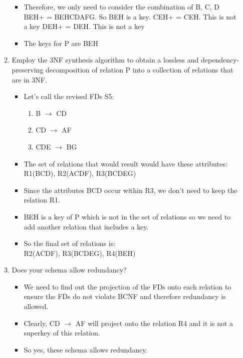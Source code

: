 \documentclass{article}
\begin{document}
\begin{enumerate}
\begin{enumerate}
\begin{itemize}
\item %
Therefore, we only need to consider the combination of B, C, D\\
BEH+ = BEHCDAFG. So BEH is a key.
CEH+ = CEH. This is not a key
DEH+ = DEH. This is not a key

\item %
The keys for P are BEH
\end{itemize}

\item %
Employ the 3NF synthesis algorithm to obtain a lossless and dependency-preserving decomposition of
relation P into a collection of relations that are in 3NF.

 \begin{itemize}
\item %
Let's call the revised FDs S5:
\begin{enumerate} 
\item B $\rightarrow$ CD
\item CD $\rightarrow$ AF
\item CDE $\rightarrow$ BG
\end{enumerate}

\item %
The set of relations that would result would have these attributes: \\
R1(BCD), R2(ACDF), R3(BCDEG)

\item %
Since the attributes BCD occur within R3, we don't need to keep the relation R1.

\item %
BEH is a key of P which is not in the set of relations so we need to add another relation that includes a key. 

\item %
So the final set of relations is: \\
R2(ACDF), R3(BCDEG), R4(BEH)
\end{itemize}

\item %
Does your schema allow redundancy?

\begin{itemize}
\item %
We need to find out the projection of the FDs onto each relation to ensure the FDs do not violate BCNF and therefore redundancy is allowed.

\item %
Clearly, CD $\rightarrow$ AF will project onto the relation R4 and it is not a superkey of this relation.

\item %
So yes, these schema allows redundancy.
\end{itemize}


\end{enumerate}

\end{enumerate}
\end{document}

